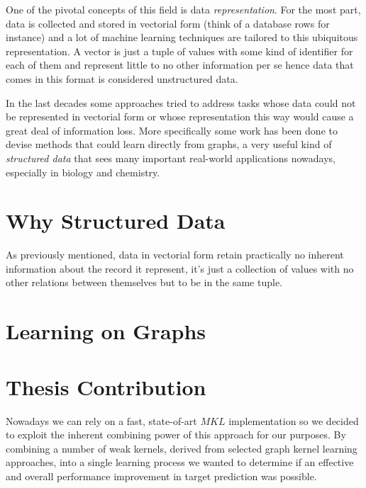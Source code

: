 One of the pivotal concepts of this field is data \emph{representation}.
For the most part, data is collected and stored in vectorial form (think of
a database rows for instance) and a lot of machine learning techniques are
tailored to this ubiquitous representation.
A vector is just a tuple of values with some kind of identifier for each of them
and represent little to no other information per se hence data that comes in
this format is considered unstructured data.

In the last decades some approaches tried to address tasks whose data could
not be represented in vectorial form or whose representation this way would cause
a great deal of information loss.
More specifically some work has been done to devise methods that could learn
directly from graphs, a very useful kind of \emph{structured data} that sees many
important real-world applications nowadays, especially in biology and chemistry.


\section{Why Structured Data}
As previously mentioned, data in vectorial form retain practically no inherent
information about the record it represent, it's just a collection of values with
no other relations between themselves but to be in the same tuple.


\section{Learning on Graphs}


\section{Thesis Contribution}

Nowadays we can rely on a fast, state-of-art $MKL$ implementation \cite{easymkl}
so we decided to exploit the inherent combining power of this approach for our
purposes.
By combining a number of weak kernels, derived from selected graph kernel
learning approaches, into a single learning process we wanted to determine if an
effective and overall performance improvement in target prediction was possible.

